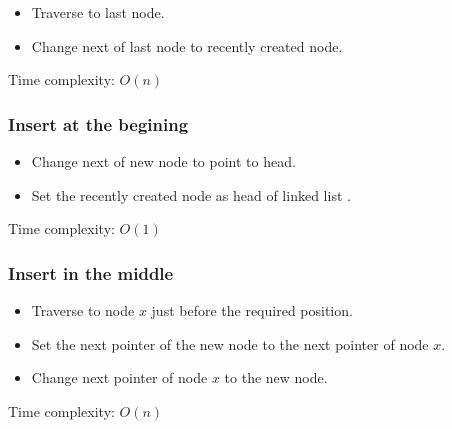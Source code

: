\documentclass[a4paper,11pt]{book}
\begin{document}
\begin{itemize}
	\item Traverse to last node.
	\item Change next of last node to recently created node.
\end{itemize}
\noindent Time complexity: $O(n)$

\subsubsection{Insert at the begining}

\begin{itemize}
	\item Change next of new node to point to head.
	\item Set the recently created node as head of linked list .
\end{itemize}
\noindent Time complexity: $O(1)$

\subsubsection{Insert in the middle}

\begin{itemize}
	\item Traverse to node $x$ just before the required position.
	\item Set the next pointer of the new node to the next pointer of node $x$.
	\item Change next pointer of node $x$ to the new node.
\end{itemize}
\noindent Time complexity: $O(n)$
\end{document}
